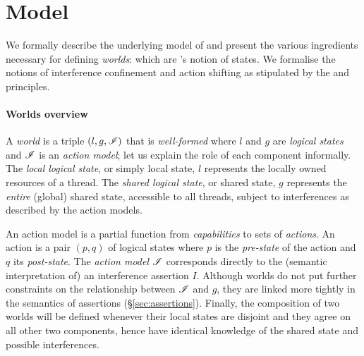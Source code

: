 \section{\colosl Model}\label{sec:model}
We formally describe the underlying model of \colosl and present the various ingredients necessary for defining \emph{worlds}: which are \colosl's notion of states.
We formalise the notions of interference confinement and action shifting as stipulated by the \extendRule and \shiftRule principles.
%
%
%
\paragraph{\textbf{Worlds overview}}
A \emph{world} is a triple $(l, g, \mathscr{I})$ that is \emph{well-formed} where $l$ and $g$ are \emph{logical states} and $\mathscr{I}$ is an \emph{action model}; let us explain the role of each component informally. The \emph{local logical state}, or simply local state, $l$ represents the locally owned resources of a thread. The \emph{shared logical state}, or shared state, $g$ represents the \emph{entire} (global) shared state, accessible to all threads, subject to interferences as described by the action models.

An action model is a partial function from \emph{capabilities} to sets of \emph{actions}. An action is a pair $(p,q)$ of logical states where $p$ is the \emph{pre-state} of the action and $q$ its \emph{post-state}.  The \emph{action model} $\mathscr{I}$ corresponds directly to the (semantic interpretation of) an interference assertion $I$. Although worlds do not put further constraints on the
relationship between $\mathscr{I}$ and $g$, they are linked more tightly in the semantics of assertions (\S\ref{sec:assertions}). 
Finally, the composition of two worlds will be defined whenever their local states are disjoint and they agree on all other two components, hence have identical knowledge of the shared state and possible interferences.\\

